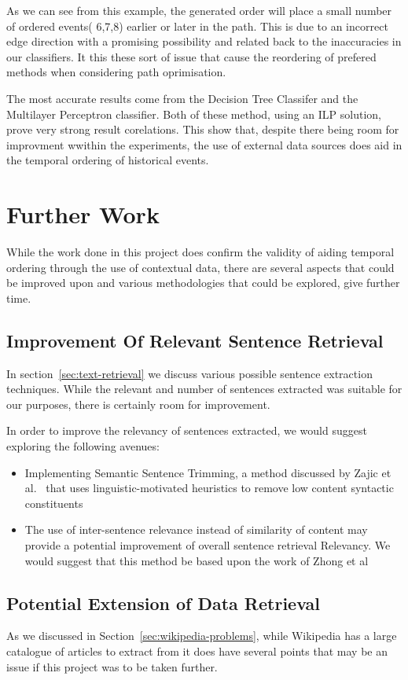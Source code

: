 \documentclass[bsc,frontabs,twoside,singlespacing,parskip,deptreport]{infthesis}     %
\begin{document}
As we can see from this example, the generated order will place a small number of ordered events( 6,7,8) earlier or
later in the path. This is due to an incorrect edge direction with a promising possibility and related back to the
inaccuracies in our classifiers. It this these sort of issue that cause the reordering of prefered methods when considering
path oprimisation.

The most accurate results come from the Decision Tree Classifer and the Multilayer Perceptron classifier.
Both of these method, using an ILP solution, prove very strong result corelations. This show that, despite there
being room for improvment wwithin the experiments, the use of external data sources does aid in the temporal ordering
of historical events.

\section{Further Work}
While the work done in this project does confirm the validity of aiding temporal ordering through the use of contextual
data, there are several aspects that could be improved upon and various methodologies that could be explored, give further
time.

\subsection{Improvement Of Relevant Sentence Retrieval}
In section~\ref{sec:text-retrieval} we discuss various possible sentence extraction techniques.
While the relevant and number of sentences extracted was suitable for our purposes, there is certainly room for improvement.

In order to improve the relevancy of sentences extracted, we would suggest exploring the following avenues:
\begin{itemize}
\item Implementing Semantic Sentence Trimming, a method discussed by Zajic et al.~\cite{zajic2005sentence} that
  uses linguistic-motivated heuristics to remove low content syntactic constituents 

\item The use of inter-sentence relevance instead of similarity of content may provide a potential improvement of
  overall sentence retrieval Relevancy. We would suggest that this method be based upon the work of Zhong et al~\cite{zhong2008practical}
\end{itemize}

\subsection{Potential Extension of Data Retrieval}
As we discussed in Section~\ref{sec:wikipedia-problems}, while Wikipedia has a large catalogue of articles to extract from
it does have several points that may be an issue if this project was to be taken further.
\end{document}
